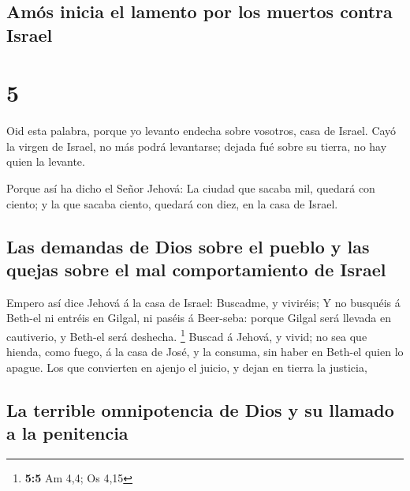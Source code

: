 \hypertarget{amuxf3s-inicia-el-lamento-por-los-muertos-contra-israel}{%
\subsection{Amós inicia el lamento por los muertos contra
Israel}\label{amuxf3s-inicia-el-lamento-por-los-muertos-contra-israel}}

\hypertarget{section-4}{%
\section{5}\label{section-4}}

 Oid esta palabra, porque yo levanto endecha sobre vosotros,
casa de Israel.  Cayó la virgen de Israel, no más podrá
levantarse; dejada fué sobre su tierra, no hay quien la levante.

 Porque así ha dicho el Señor Jehová: La ciudad que sacaba
mil, quedará con ciento; y la que sacaba ciento, quedará con diez, en la
casa de Israel.

\hypertarget{las-demandas-de-dios-sobre-el-pueblo-y-las-quejas-sobre-el-mal-comportamiento-de-israel}{%
\subsection{Las demandas de Dios sobre el pueblo y las quejas sobre el
mal comportamiento de
Israel}\label{las-demandas-de-dios-sobre-el-pueblo-y-las-quejas-sobre-el-mal-comportamiento-de-israel}}

 Empero así dice Jehová á la casa de Israel: Buscadme, y
viviréis;  Y no busquéis á Beth-el ni entréis en Gilgal, ni
paséis á Beer-seba: porque Gilgal será llevada en cautiverio, y Beth-el
será deshecha. \footnote{\textbf{5:5} Am 4,4; Os 4,15} 
Buscad á Jehová, y vivid; no sea que hienda, como fuego, á la casa de
José, y la consuma, sin haber en Beth-el quien lo apague. 
Los que convierten en ajenjo el juicio, y dejan en tierra la justicia,

\hypertarget{la-terrible-omnipotencia-de-dios-y-su-llamado-a-la-penitencia}{%
\subsection{La terrible omnipotencia de Dios y su llamado a la
penitencia}\label{la-terrible-omnipotencia-de-dios-y-su-llamado-a-la-penitencia}}

